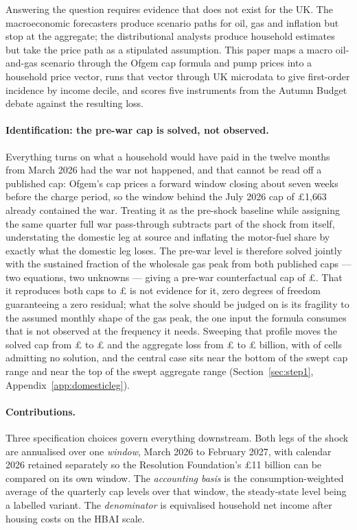 Answering the question requires evidence that does not exist for the UK. The macroeconomic forecasters produce scenario paths for oil, gas and inflation but stop at the aggregate; the distributional analysts produce household estimates but take the price path as a stipulated assumption. This paper maps a macro oil-and-gas scenario through the Ofgem cap formula and pump prices into a household price vector, runs that vector through UK microdata to give first-order incidence by income decile, and scores five instruments from the Autumn Budget debate against the resulting loss.

\paragraph{Identification: the pre-war cap is solved, not observed.} Everything turns on what a household would have paid in the twelve months from March 2026 had the war not happened, and that cannot be read off a published cap: Ofgem's cap prices a forward window closing about seven weeks before the charge period, so the window behind the July 2026 cap of \pounds 1{,}663 already contained the war. Treating it as the pre-shock baseline while assigning the same quarter full war pass-through subtracts part of the shock from itself, understating the domestic leg at source and inflating the motor-fuel share by exactly what the domestic leg loses. The pre-war level is therefore solved jointly with the sustained fraction of the wholesale gas peak from both published caps --- two equations, two unknowns --- giving a pre-war counterfactual cap of \pounds \genCapBaselineLevel{}. That it reproduces both caps to \pounds \genCapFitMaxErrorGbp{} is not evidence for it, zero degrees of freedom guaranteeing a zero residual; what the solve should be judged on is its fragility to the assumed monthly shape of the gas peak, the one input the formula consumes that is not observed at the frequency it needs. Sweeping that profile moves the solved cap from \pounds \genGasProfileCapMinGbp{} to \pounds \genGasProfileCapMaxGbp{} and the aggregate loss from \pounds \genGasProfileAggMinBn{} to \pounds \genGasProfileAggMaxBn{} billion, with \genGasProfileNonIdentifiedCount{} of \genGasProfileCellCount{} cells admitting no solution, and the central case sits near the bottom of the swept cap range and near the top of the swept aggregate range (Section~\ref{sec:step1}, Appendix~\ref{app:domesticleg}).

\paragraph{Contributions.} Three specification choices govern everything downstream. Both legs of the shock are annualised over one \emph{window}, March 2026 to February 2027, with calendar 2026 retained separately so the Resolution Foundation's \pounds 11 billion \citep{rf2026outlook} can be compared on its own window. The \emph{accounting basis} is the consumption-weighted average of the quarterly cap levels over that window, the steady-state level being a labelled variant. The \emph{denominator} is equivalised household net income after housing costs on the HBAI scale.

